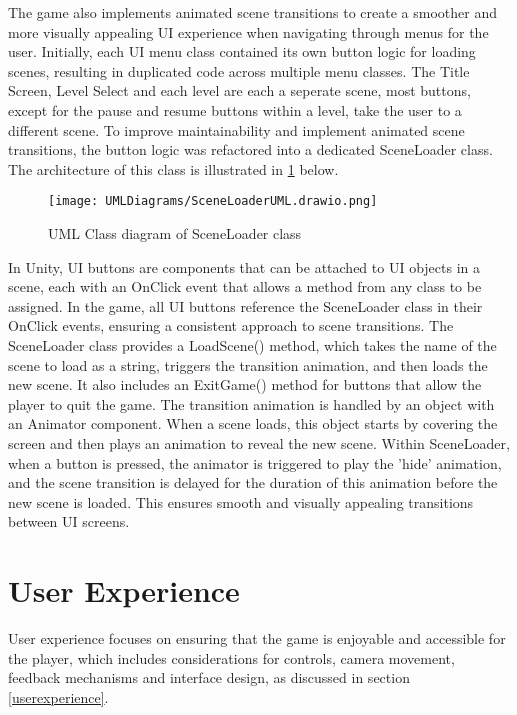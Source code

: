 \documentclass[]{final_report}
\begin{document}
The game also implements animated scene transitions to create a smoother and more visually appealing UI experience when navigating through menus for the user. Initially, each UI menu class contained its own button logic for loading scenes, resulting in duplicated code across multiple menu classes. The Title Screen, Level Select and each level are each a seperate scene, most buttons, except for the pause and resume buttons within a level, take the user to a different scene. To improve maintainability and implement animated scene transitions, the button logic was refactored into a dedicated SceneLoader class. The architecture of this class is illustrated in \ref{fig:label_SceneLoader} below.

\begin{figure}[H]
    \centering
    \texttt{[image: UMLDiagrams/SceneLoaderUML.drawio.png]}
    \caption{UML Class diagram of SceneLoader class}
    \label{fig:label_SceneLoader}
\end{figure}

In Unity, UI buttons are components that can be attached to UI objects in a scene, each with an OnClick event that allows a method from any class to be assigned. In the game, all UI buttons reference the SceneLoader class in their OnClick events, ensuring a consistent approach to scene transitions. The SceneLoader class provides a LoadScene() method, which takes the name of the scene to load as a string, triggers the transition animation, and then loads the new scene. It also includes an ExitGame() method for buttons that allow the player to quit the game. The transition animation is handled by an object with an Animator component. When a scene loads, this object starts by covering the screen and then plays an animation to reveal the new scene. Within SceneLoader, when a button is pressed, the animator is triggered to play the 'hide' animation, and the scene transition is delayed for the duration of this animation before the new scene is loaded. This ensures smooth and visually appealing transitions between UI screens.
\color{black}

\section{User Experience}
User experience focuses on ensuring that the game is enjoyable and accessible for the player, which includes considerations for controls, camera movement, feedback mechanisms and interface design, as discussed in section \ref{userexperience}. 
\end{document}
